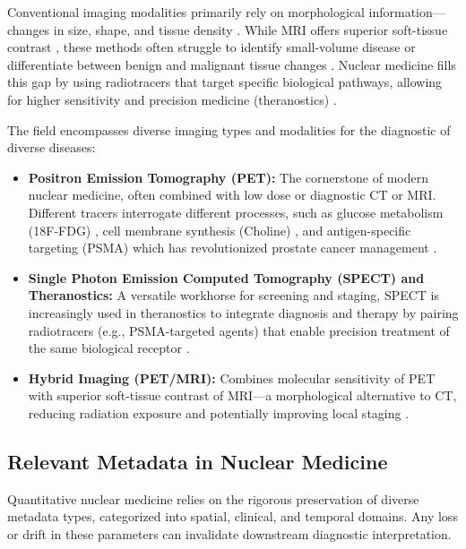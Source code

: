 \documentclass[10pt,letterpaper]{article}
\begin{document}
Conventional imaging modalities primarily rely on morphological information—changes in size, shape, and tissue density \cite{GammelSolari2024, FrumerMilk2020}. While MRI offers superior soft-tissue contrast \cite{GammelSolari2024}, these methods often struggle to identify small-volume disease or differentiate between benign and malignant tissue changes \cite{CaraccioloCastello2022, SoeterikWever2022}. Nuclear medicine fills this gap by using radiotracers that target specific biological pathways, allowing for higher sensitivity and precision medicine (theranostics) \cite{MoreiraMussi2022, GammelSolari2024}.

The field encompasses diverse imaging types and modalities for the diagnostic of diverse diseases:
\begin{itemize}
    \item \textbf{Positron Emission Tomography (PET):} The cornerstone of modern nuclear medicine, often combined with low dose or diagnostic CT or MRI. Different tracers interrogate different processes, such as glucose metabolism (18F-FDG) \cite{MurthySonni2021, LiZelchan2022}, cell membrane synthesis (Choline) \cite{MarkoGould2016, LiZelchan2022}, and antigen-specific targeting (PSMA) which has revolutionized prostate cancer management \cite{MurthySonni2021, AmalachandranSivathapandi2024}.
    \item \textbf{Single Photon Emission Computed Tomography (SPECT) and Theranostics:} A versatile workhorse for screening and staging, SPECT is increasingly used in theranostics to integrate diagnosis and therapy by pairing radiotracers (e.g., PSMA-targeted agents) that enable precision treatment of the same biological receptor \cite{KoehlerBerliner2023, BarakatYacoub2020, WangKetteler2024}.
    \item \textbf{Hybrid Imaging (PET/MRI):} Combines molecular sensitivity of PET with superior soft-tissue contrast of MRI—a morphological alternative to CT, reducing radiation exposure and potentially improving local staging \cite{LiuSheng2021, WooGhafoor2020}.
\end{itemize}

\subsection*{Relevant Metadata in Nuclear Medicine}
Quantitative nuclear medicine relies on the rigorous preservation of diverse metadata types, categorized into spatial, clinical, and temporal domains. Any loss or drift in these parameters can invalidate downstream diagnostic interpretation.
\end{document}

